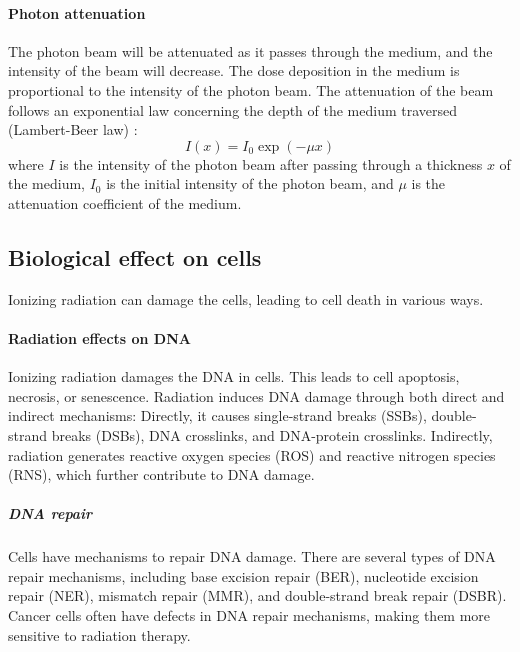 \paragraph{Photon attenuation}
The photon beam will be attenuated as it passes through the medium, and the intensity of the beam will decrease.
The dose deposition in the medium is proportional to the intensity of the photon beam.
The attenuation of the beam follows an exponential law concerning the depth of the medium traversed (Lambert-Beer law) \cite{Beer1852}:
$$I(x) = I_0 \exp(-\mu x)$$
where $I$ is the intensity of the photon beam after passing through a thickness $x$ of the medium,
$I_0$ is the initial intensity of the photon beam,
and $\mu$ is the attenuation coefficient of the medium.


\subsection{Biological effect on cells}
Ionizing radiation can damage the cells, leading to cell death in various ways.

\paragraph{Radiation effects on DNA}
Ionizing radiation damages the DNA in cells.
This leads to cell apoptosis, necrosis, or senescence.
Radiation induces DNA damage through both direct and indirect mechanisms:
Directly, it causes single-strand breaks (SSBs), double-strand breaks (DSBs), DNA crosslinks, and DNA-protein crosslinks.
Indirectly, radiation generates reactive oxygen species (ROS) and reactive nitrogen species (RNS), which further contribute to DNA damage.

\subparagraph{DNA repair}
Cells have mechanisms to repair DNA damage.
There are several types of DNA repair mechanisms, including base excision repair (BER), nucleotide excision repair (NER), mismatch repair (MMR), and double-strand break repair (DSBR).
Cancer cells often have defects in DNA repair mechanisms, making them more sensitive to radiation therapy.

